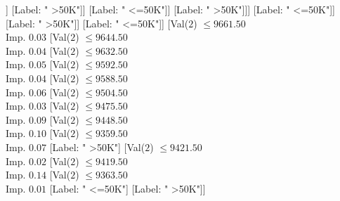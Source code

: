 \documentclass[margin=10pt]{standalone}
\begin{document}
\begin{forest}
																																	[Val($2$) $ \leq 9261.50$ \\ Imp. $0.09$
																																		[Label: " <=50K"]
																																		[Val($2$) $ \leq 9297.50$ \\ Imp. $0.08$
																																			[Val($2$) $ \leq 9293.50$ \\ Imp. $0.24$
																																				[Val($2$) $ \leq 9278.50$ \\ Imp. $0.20$
																																					[Val($2$) $ \leq 9267.50$ \\ Imp. $0.19$
																																						[Label: " >50K"]
																																						[Label: " <=50K"]]
																																					[Label: " >50K"]]
																																				[Label: " <=50K"]]
																																			[Label: " >50K"]]]
																																	[Label: " <=50K"]]
																																[Label: " >50K"]]
																															[Label: " <=50K"]]
																														[Val($2$) $ \leq 9661.50$ \\ Imp. $0.03$
																															[Val($2$) $ \leq 9644.50$ \\ Imp. $0.04$
																																[Val($2$) $ \leq 9632.50$ \\ Imp. $0.05$
																																	[Val($2$) $ \leq 9592.50$ \\ Imp. $0.04$
																																		[Val($2$) $ \leq 9588.50$ \\ Imp. $0.06$
																																			[Val($2$) $ \leq 9504.50$ \\ Imp. $0.03$
																																				[Val($2$) $ \leq 9475.50$ \\ Imp. $0.09$
																																					[Val($2$) $ \leq 9448.50$ \\ Imp. $0.10$
																																						[Val($2$) $ \leq 9359.50$ \\ Imp. $0.07$
																																							[Label: " >50K"]
																																							[Val($2$) $ \leq 9421.50$ \\ Imp. $0.02$
																																								[Val($2$) $ \leq 9419.50$ \\ Imp. $0.14$
																																									[Val($2$) $ \leq 9363.50$ \\ Imp. $0.01$
																																										[Label: " <=50K"]
																																										[Label: " >50K"]]

\end{forest}
\end{document}
